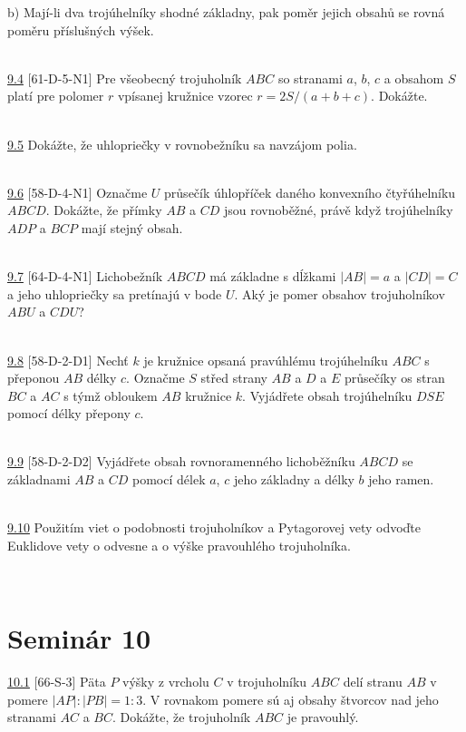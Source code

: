 b) Mají-li dva trojúhelníky shodné základny, pak poměr jejich obsahů se rovná poměru příslušných výšek.


\\

\noindent \ul{9.4} [61-D-5-N1]  Pre všeobecný trojuholník $ABC$ so stranami $a$, $b$, $c$ a obsahom $S$ platí pre polomer $r$ vpísanej kružnice vzorec $r = 2S/(a + b + c)$. Dokážte.


\\

\noindent \ul{9.5} Dokážte, že uhlopriečky v rovnobežníku sa navzájom polia.


\\

\noindent \ul{9.6} [58-D-4-N1]  Označme $U$ průsečík úhlopříček daného konvexního čtyřúhelníku
$ABCD$. Dokážte, že přímky $AB$ a $CD$ jsou rovnoběžné, právě když trojúhelníky $ADP$ a $BCP$
mají stejný obsah.

\\

\noindent \ul{9.7} [64-D-4-N1] Lichobežník $ABCD$ má základne s dĺžkami $|AB|=a$ a $|CD|=C$ a jeho uhlopriečky sa pretínajú v bode $U$. Aký je pomer obsahov trojuholníkov $ABU$ a $CDU$?


\\

\noindent \ul{9.8} [58-D-2-D1] Nechť $k$ je kružnice opsaná pravúhlému trojúhelníku $ABC$ s
přeponou $AB$ délky $c$. Označme $S$ střed strany $AB$ a $D$ a $E$ průsečíky os stran $BC$ a $AC$
s týmž obloukem $AB$ kružnice $k$. Vyjádřete obsah trojúhelníku $DSE$ pomocí délky přepony $c$.


\\

\noindent \ul{9.9} [58-D-2-D2] Vyjádřete obsah rovnoramenného lichoběžníku $ABCD$ se základnami $AB$
a $CD$ pomocí délek $a$, $c$ jeho základny a délky $b$ jeho ramen.


\\

\noindent \ul{9.10} Použitím viet o podobnosti trojuholníkov a Pytagorovej vety odvoďte Euklidove vety o odvesne a o výške pravouhlého trojuholníka.

\\

\section*{Seminár 10}

\noindent \ul{10.1} [66-S-3] Päta $P$ výšky z vrcholu $C$ v trojuholníku $ABC$ delí stranu $AB$ v pomere $|AP| : |PB|= 1 : 3$. V rovnakom pomere sú aj obsahy štvorcov nad jeho stranami $AC$ a $BC$.
Dokážte, že trojuholník $ABC$ je pravouhlý.

